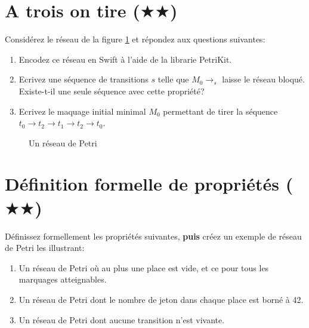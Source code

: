 \documentclass[a4paper, titlepage]{article}
\numberwithin{figure}{section}
\numberwithin{table}{section}
\begin{document}
  \section{A trois on tire ($\bigstar\bigstar$)}
    Considérez le réseau de la figure \ref{fig:sequence} et répondez aux questions suivantes:
    \begin{enumerate}
      \item Encodez ce réseau en Swift à l'aide de la librarie PetriKit.
      \item Ecrivez une séquence de transitions $s$
            telle que $M_0 \rightarrow_s$ laisse le réseau bloqué.
            Existe-t-il une seule séquence avec cette propriété?
      \item Ecrivez le maquage initial minimal $M_0$
            permettant de tirer la séquence
            $t_0 \rightarrow t_2 \rightarrow t_1 \rightarrow t_2 \rightarrow t_0$.
    \end{enumerate}

  \begin{figure}[ht]
    \centering
    \caption{Un réseau de Petri}
    \label{fig:sequence}
  \end{figure}

  \section{Définition formelle de propriétés ($\bigstar\bigstar$)}
		Définissez formellement les propriétés suivantes, \textbf{puis} créez un exemple de réseau de Petri les illustrant:
		\begin{enumerate}
			\item Un réseau de Petri où au plus une place est vide, et ce pour tous les marquages atteignables.
			\item Un réseau de Petri dont le nombre de jeton dans chaque place est borné à 42.
			\item Un réseau de Petri dont aucune transition n'est vivante.
		\end{enumerate}
\end{document}
